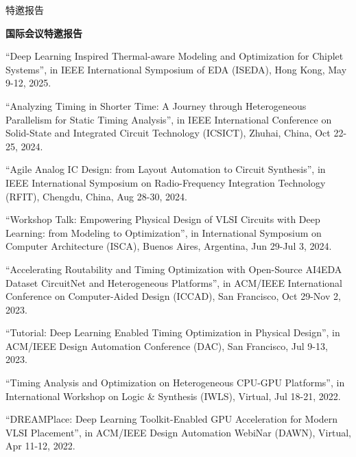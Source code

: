 \begin{rSection}{特邀报告}


\textbf{国际会议特邀报告}
        
\begin{description}[font=\normalfont]

\item[{[12]}]{
``Deep Learning Inspired Thermal-aware Modeling and Optimization for Chiplet Systems'', in IEEE International Symposium of EDA (ISEDA), Hong Kong, May 9-12, 2025. 
}

\item[{[11]}]{
``Analyzing Timing in Shorter Time: A Journey through Heterogeneous Parallelism for Static Timing Analysis'', in IEEE International Conference on Solid-State and Integrated Circuit Technology (ICSICT), Zhuhai, China, Oct 22-25, 2024. 
}

\item[{[10]}]{
``Agile Analog IC Design: from Layout Automation to Circuit Synthesis'', in IEEE International Symposium on Radio-Frequency Integration Technology (RFIT), Chengdu, China, Aug 28-30, 2024. 
}

\item[{[9]}]{
``Workshop Talk: Empowering Physical Design of VLSI Circuits with Deep Learning: from Modeling to Optimization'', in International Symposium on Computer Architecture (ISCA), Buenos Aires, Argentina, Jun 29-Jul 3, 2024. 
}

\item[{[8]}]{
``Accelerating Routability and Timing Optimization with Open-Source AI4EDA Dataset CircuitNet and Heterogeneous Platforms'', in ACM/IEEE International Conference on Computer-Aided Design (ICCAD), San Francisco, Oct 29-Nov 2, 2023. 
}

\item[{[7]}]{
``Tutorial: Deep Learning Enabled Timing Optimization in Physical Design'', in ACM/IEEE Design Automation Conference (DAC), San Francisco, Jul 9-13, 2023. 
}

\item[{[6]}]{
``Timing Analysis and Optimization on Heterogeneous CPU-GPU Platforms'', in International Workshop on Logic \& Synthesis (IWLS), Virtual, Jul 18-21, 2022. 
}

\item[{[5]}]{
``DREAMPlace: Deep Learning Toolkit-Enabled GPU Acceleration for Modern VLSI Placement'', in ACM/IEEE Design Automation WebiNar (DAWN), Virtual, Apr 11-12, 2022. 
}


\end{description}
\end{rSection}
